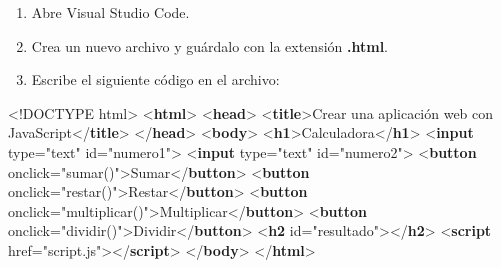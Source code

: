 \documentclass[
  a4paper,
  DIV=11,
  numbers=noendperiod,
  onepage,
  openany]{scrreprt}
\newenvironment{Shaded}{\begin{snugshade}}{\end{snugshade}}
\newcommand{\DataTypeTok}[1]{\textcolor[rgb]{0.68,0.00,0.00}{#1}}
\newcommand{\KeywordTok}[1]{\textcolor[rgb]{0.00,0.23,0.31}{\textbf{#1}}}
\newcommand{\NormalTok}[1]{\textcolor[rgb]{0.00,0.23,0.31}{#1}}
\newcommand{\OperatorTok}[1]{\textcolor[rgb]{0.37,0.37,0.37}{#1}}
\newcommand{\OtherTok}[1]{\textcolor[rgb]{0.00,0.23,0.31}{#1}}
\newcommand{\StringTok}[1]{\textcolor[rgb]{0.13,0.47,0.30}{#1}}
\begin{document}
\begin{tcolorbox}
\begin{enumerate}
\def\labelenumi{\arabic{enumi}.}
\item
  Abre Visual Studio Code.
\item
  Crea un nuevo archivo y guárdalo con la extensión \textbf{.html}.
\item
  Escribe el siguiente código en el archivo:
\end{enumerate}

\begin{Shaded}
\begin{Highlighting}[]

\DataTypeTok{\textless{}!DOCTYPE}\NormalTok{ html}\DataTypeTok{\textgreater{}}
\DataTypeTok{\textless{}}\KeywordTok{html}\DataTypeTok{\textgreater{}}
\DataTypeTok{\textless{}}\KeywordTok{head}\DataTypeTok{\textgreater{}}
    \DataTypeTok{\textless{}}\KeywordTok{title}\DataTypeTok{\textgreater{}}\NormalTok{Crear una aplicación web con JavaScript}\DataTypeTok{\textless{}/}\KeywordTok{title}\DataTypeTok{\textgreater{}}
\DataTypeTok{\textless{}/}\KeywordTok{head}\DataTypeTok{\textgreater{}}
\DataTypeTok{\textless{}}\KeywordTok{body}\DataTypeTok{\textgreater{}}
    \DataTypeTok{\textless{}}\KeywordTok{h1}\DataTypeTok{\textgreater{}}\NormalTok{Calculadora}\DataTypeTok{\textless{}/}\KeywordTok{h1}\DataTypeTok{\textgreater{}}
    \DataTypeTok{\textless{}}\KeywordTok{input}\OtherTok{ type}\OperatorTok{=}\StringTok{"text"}\OtherTok{ id}\OperatorTok{=}\StringTok{"numero1"}\DataTypeTok{\textgreater{}}
    \DataTypeTok{\textless{}}\KeywordTok{input}\OtherTok{ type}\OperatorTok{=}\StringTok{"text"}\OtherTok{ id}\OperatorTok{=}\StringTok{"numero2"}\DataTypeTok{\textgreater{}}
    \DataTypeTok{\textless{}}\KeywordTok{button}\OtherTok{ onclick}\OperatorTok{=}\StringTok{"sumar()"}\DataTypeTok{\textgreater{}}\NormalTok{Sumar}\DataTypeTok{\textless{}/}\KeywordTok{button}\DataTypeTok{\textgreater{}}
    \DataTypeTok{\textless{}}\KeywordTok{button}\OtherTok{ onclick}\OperatorTok{=}\StringTok{"restar()"}\DataTypeTok{\textgreater{}}\NormalTok{Restar}\DataTypeTok{\textless{}/}\KeywordTok{button}\DataTypeTok{\textgreater{}}
    \DataTypeTok{\textless{}}\KeywordTok{button}\OtherTok{ onclick}\OperatorTok{=}\StringTok{"multiplicar()"}\DataTypeTok{\textgreater{}}\NormalTok{Multiplicar}\DataTypeTok{\textless{}/}\KeywordTok{button}\DataTypeTok{\textgreater{}}
    \DataTypeTok{\textless{}}\KeywordTok{button}\OtherTok{ onclick}\OperatorTok{=}\StringTok{"dividir()"}\DataTypeTok{\textgreater{}}\NormalTok{Dividir}\DataTypeTok{\textless{}/}\KeywordTok{button}\DataTypeTok{\textgreater{}}
    \DataTypeTok{\textless{}}\KeywordTok{h2}\OtherTok{ id}\OperatorTok{=}\StringTok{"resultado"}\DataTypeTok{\textgreater{}\textless{}/}\KeywordTok{h2}\DataTypeTok{\textgreater{}}
    \DataTypeTok{\textless{}}\KeywordTok{script}\OtherTok{ href}\OperatorTok{=}\StringTok{"script.js"}\DataTypeTok{\textgreater{}\textless{}/}\KeywordTok{script}\DataTypeTok{\textgreater{}}
\DataTypeTok{\textless{}/}\KeywordTok{body}\DataTypeTok{\textgreater{}}
\DataTypeTok{\textless{}/}\KeywordTok{html}\DataTypeTok{\textgreater{}}
\end{Highlighting}
\end{Shaded}


\end{tcolorbox}
\end{document}
